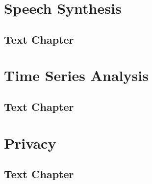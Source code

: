 \documentclass[11pt,fleqn]{book} %
\begin{document}


\part{Speech Synthesis}



\chapter{Text Chapter}



\part{Time Series Analysis}



\chapter{Text Chapter}



\part{Privacy}



\chapter{Text Chapter}
\end{document}
